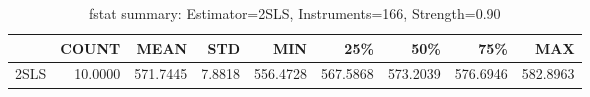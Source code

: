 \begin{table}[ht]
\centering
\caption{fstat summary: Estimator=2SLS, Instruments=166, Strength=0.90}
\begin{tabular}{lrrrrrrrr}
\toprule
 & COUNT & MEAN & STD & MIN & 25\% & 50\% & 75\% & MAX \\
\midrule
2SLS & 10.0000 & 571.7445 & 7.8818 & 556.4728 & 567.5868 & 573.2039 & 576.6946 & 582.8963 \\
\bottomrule
\end{tabular}
\end{table}
